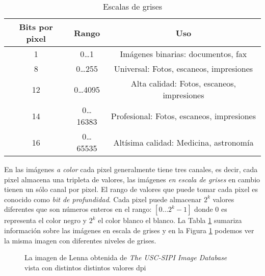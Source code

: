 \begin{table}
  \caption[Escala de grises]{Escalas de grises \cite{burger2008digital}} 
  \label{table:grayscales}
\begin{center}
{\small
    \begin{tabular}{c|c|c}
    \hline
    {\bf Bits por pixel} & 
    {\bf Rango} & 
    {\bf Uso} \\
    \hline
    1  & 0\dots1     & Imágenes binarias: documentos, fax \\
    8  & 0\dots255   & Universal: Fotos, escaneos, impresiones   \\
    12 & 0\dots4095  & Alta calidad: Fotos, escaneos, impresiones   \\
    14 & 0\dots16383 & Profesional: Fotos, escaneos, impresiones   \\
    16 & 0\dots65535 & Altísima calidad: Medicina, astronomía   \\
    \hline
    \end{tabular}
}
\end{center}
\end{table}

En las imágenes \textit{a color} cada pixel generalmente tiene tres canales, es
decir, cada pixel almacena una tripleta de valores, las imágenes \textit{en
escala de grises} en cambio tienen un sólo canal por pixel. El rango de valores
que puede tomar cada pixel es conocido como \textit{bit de profundidad}. Cada
pixel puede almacenar $2^k$ valores diferentes que son números enteros en el
rango: $[0\dots2^k - 1]$ donde $0$ es representa el color negro y $2^k$ el color
blanco el blanco. La Tabla \ref{table:grayscales} sumariza información sobre
las imágenes en escala de grises y en la Figura \ref{grayscales} podemos ver la
misma imagen con diferentes niveles de grises.

\begin{figure}[h]
    \centering



  \caption[Resolución]{La imagen de Lenna obtenida de \textit{The USC-SIPI Image Database}
  vista con distintos distintos valores dpi}
  
  \label{grayscales}
\end{figure}

